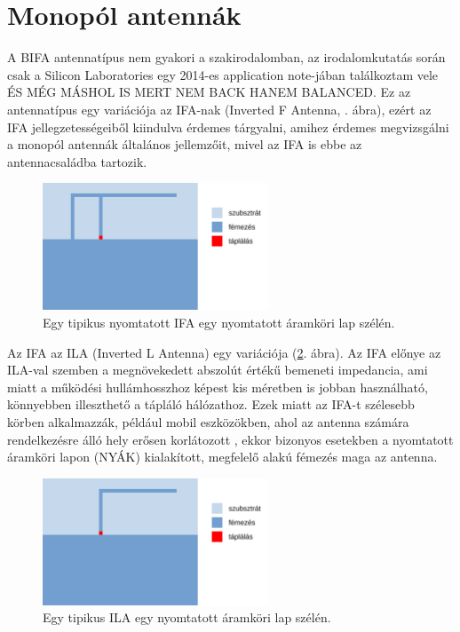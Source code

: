 \section{Monopól antennák}
\par A BIFA antennatípus nem gyakori a szakirodalomban, az irodalomkutatás során csak a Silicon Laboratories egy 2014-es application note-jában \cite{an847} találkoztam vele \huge{ÉS MÉG MÁSHOL IS MERT NEM BACK HANEM BALANCED}. \normalsize Ez az antennatípus egy variációja az IFA-nak (Inverted F Antenna, . ábra), ezért az IFA jellegzetességeiből kiindulva érdemes tárgyalni, amihez érdemes megvizsgálni a monopól antennák általános jellemzőit, mivel az IFA is ebbe az antennacsaládba tartozik.
\begin{figure}[h]
	\centering
	\includegraphics[width=0.6\textwidth]{kep/tipikus_ifa.pdf}
	\caption{Egy tipikus nyomtatott IFA egy nyomtatott áramköri lap szélén.}
	\label{fig:tipikus_ifa}
\end{figure}
\par Az IFA az ILA (Inverted L Antenna) egy variációja (\ref{fig:tipikus_ila}. ábra). Az IFA előnye az ILA-val szemben a megnövekedett abszolút értékű bemeneti impedancia, ami miatt a működési hullámhosszhoz képest kis méretben is jobban használható, könnyebben illeszthető a tápláló hálózathoz. Ezek miatt az IFA-t szélesebb körben alkalmazzák, például mobil eszközökben, ahol az antenna számára rendelkezésre álló hely erősen korlátozott \cite{multi-band}, ekkor bizonyos esetekben a nyomtatott áramköri lapon (NYÁK) kialakított, megfelelő alakú fémezés maga az antenna.
\begin{figure}[h]
	\centering
	\includegraphics[width=0.6\textwidth]{kep/tipikus_ila.pdf}
	\caption{Egy tipikus ILA egy nyomtatott áramköri lap szélén.}
	\label{fig:tipikus_ila}
\end{figure}
